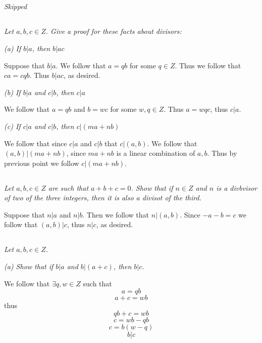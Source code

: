 \documentclass[11pt,oneside,titlepage]{book}
\begin{document}
\subsection{}
\subsection{}
\textit{Skipped}

\subsection{}

\textit{Let $a, b, c \in Z$. Give a proof for these facts about divisors:}

\textit{(a) If $b|a$, then $b|ac$}

Suppose that $b|a$. We follow that $a = qb$ for some $q \in Z$. Thus we follow that
$ca = cqb$. Thus $b|ac$, as desired.

\textit{(b) If $b|a$ and $c|b$, then $c|a$}

We follow that $a = qb$ and $b = wc$ for some $w, q \in Z$. Thus $a = wqc$, thus $c|a$.

\textit{(c) If $c|a$ and $c|b$, then $c|(ma + nb)$}

We follow that since $c|a$ and $c|b$ that $c|(a, b)$. We follow that $(a, b)|(ma + nb)$, since
$ma + nb$ is a linear combination of $a, b$. Thus by previous point we follow
$c | (ma + nb)$.

\subsection{}

\textit{Let $a, b, c \in Z$ are such that $a + b + c = 0$. Show that if $n \in Z$
  and $n$ is a divbvisor of two of the three integers, then it is also a divisot of the third.}

Suppose that $n|a$ and $n|b$. Then we follow that $n|(a, b)$. Since $-a - b = c$ we follow that
$(a, b) | c$, thus $n|c$, as desired.

\subsection{}

\textit{Let $a, b, c \in Z$.}

\textit{(a) Show that if $b|a$ and $b|(a + c)$, then $b|c$.}

We follow that $\exists q, w \in Z$ such that 
$$a = qb $$
$$a + c = wb$$
thus 
$$qb + c = wb$$
$$c = wb - qb$$
$$c = b(w - q)$$
$$b | c$$
\end{document}

